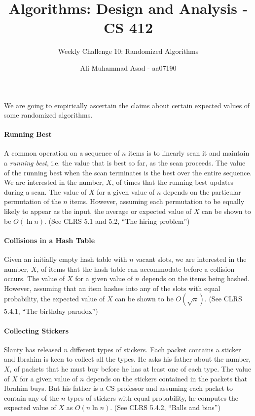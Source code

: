 \documentclass[addpoints]{exam}
\title{Algorithms: Design and Analysis - CS 412 \vspace*{-4mm}}
\author{Weekly Challenge 10: Randomized Algorithms}
\date{\vspace*{-4mm} Ali Muhammad Asad - aa07190}
\begin{document}
\maketitle

\begin{questions}
  \question[2] We are going to empirically ascertain the claims about certain expected values of some randomized algorithms.

  \paragraph{Running Best} A common operation on a sequence of $n$ items is to linearly scan it and maintain a \textit{running best}, i.e. the value that is best so far, as the scan proceeds. The value of the running best when the scan terminates is the best over the entire sequence. We are interested in the number, $X$, of times that the running best updates during a scan. The value of $X$ for a given value of $n$ depends on the particular permutation of the $n$ items. However, assuming each permutation to be equally likely to appear as the input, the average or expected value of $X$ can be shown to be $O(\ln n)$. (See CLRS 5.1 and 5.2, ``The hiring problem'')

  \paragraph{Collisions in a Hash Table} Given an initially empty hash table with $n$ vacant slots, we are interested in the number, $X$, of items that the hash table can accommodate before a collision occurs. The value of $X$ for a given value of $n$ depends on the items being hashed. However, assuming that an item hashes into any of the slots with equal probability, the expected value of $X$ can be shown to be $O(\sqrt{n})$. (See CLRS 5.4.1, ``The birthday paradox'')

  \paragraph{Collecting Stickers} Slanty \href{https://www.facebook.com/slantypakistan/photos/dont-let-the-stickers-run-out-collect-them-allshare-with-us-your-collection-and-/800854163429315/}{has released} $n$ different types of stickers. Each packet contains a sticker and Ibrahim is keen to collect all the types. He asks his father about the number, $X$, of packets that he must buy before he has at least one of each type. The value of $X$ for a given value of $n$ depends on the stickers contained in the packets that Ibrahim buys. But his father is a CS professor and assuming each packet to contain any of the $n$ types of stickers with equal probability, he computes the expected value of $X$ as $O(n\ln n)$. (See CLRS 5.4.2, ``Balls and bins'')


\end{questions}
\end{document}
